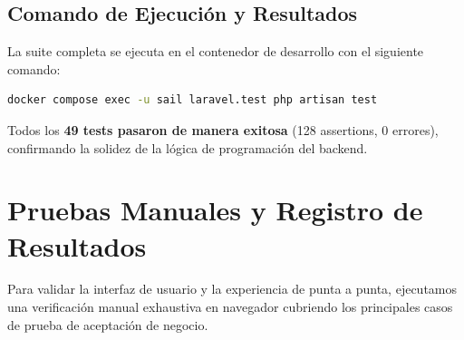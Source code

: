 \subsection{Comando de Ejecución y Resultados}
La suite completa se ejecuta en el contenedor de desarrollo con el siguiente comando:
\begin{lstlisting}[language=bash]
docker compose exec -u sail laravel.test php artisan test
\end{lstlisting}
Todos los \textbf{49 tests pasaron de manera exitosa} (128 assertions, 0 errores), confirmando la solidez de la lógica de programación del backend.

\section{Pruebas Manuales y Registro de Resultados}
Para validar la interfaz de usuario y la experiencia de punta a punta, ejecutamos una verificación manual exhaustiva en navegador cubriendo los principales casos de prueba de aceptación de negocio.


